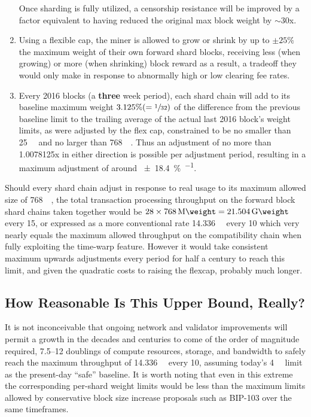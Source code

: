 \begin{enumerate}
Once sharding is fully utilized, a censorship resistance will be
improved by a factor equivalent to having reduced the original max
block weight by $\sim 30$x.

  \item

    Using a flexible cap, the miner is allowed to grow or shrink by up
    to $\pm 25\%$ the maximum weight of their own forward shard
    blocks, receiving less (when growing) or more (when shrinking)
    block reward as a result, a tradeoff they would only make in
    response to abnormally high or low clearing fee rates.

  \item

    Every \num{2016} blocks (a \textbf{three} week period), each shard
    chain will add to its baseline maximum weight $3.125\% (=
    \sfrac{1}{32})$ of the difference from the previous baseline limit
    to the trailing average of the actual last \num{2016} block's
    weight limits, as were adjusted by the flex cap, constrained to be
    no smaller than \SI{25}{\kilo\weight} and no larger than
    \SI{768}{\mega\weight}.  Thus an adjustment of no more than
    \num{1.0078125}x in either direction is possible per adjustment
    period, resulting in a maximum adjustment of around
    \SI[per-mode=symbol]{\pm 18.4}{\percent\per\year}.

\end{enumerate}

Should every shard chain adjust in response to real usage to its
maximum allowed size of \SI{768}{\mega\weight}, the total transaction
processing throughput on the forward block shard chains taken together
would be $28 \times \SI{768}{\mega\weight}=\SI{21.504}{\giga\weight}$
every \SI{15}{\min}, or expressed as a more conventional rate
\SI{14.336}{\giga\weight} every \SI{10}{\min} which very nearly equals
the maximum allowed throughput on the compatibility chain when fully
exploiting the time-warp feature.  However it would take consistent
maximum upwards adjustments every period for half a century to reach
this limit, and given the quadratic costs to raising the flexcap,
probably much longer.

\subsection{How Reasonable Is This Upper Bound, Really?}

It is not inconceivable that ongoing network and validator
improvements will permit a growth in the decades and centuries to come
of the order of magnitude required, \numrange{7.5}{12} doublings of
compute resources, storage, and bandwidth to safely reach the maximum
throughput of \SI{14.336}{\giga\weight} every \SI{10}{\min}, assuming
today's \SI{4}{\mega\weight} limit as the present-day ``safe''
baseline.  It is worth noting that even in this extreme the
corresponding per-shard weight limits would be less than the maximum
limits allowed by conservative block size increase proposals such as
BIP-103 over the same timeframes.


